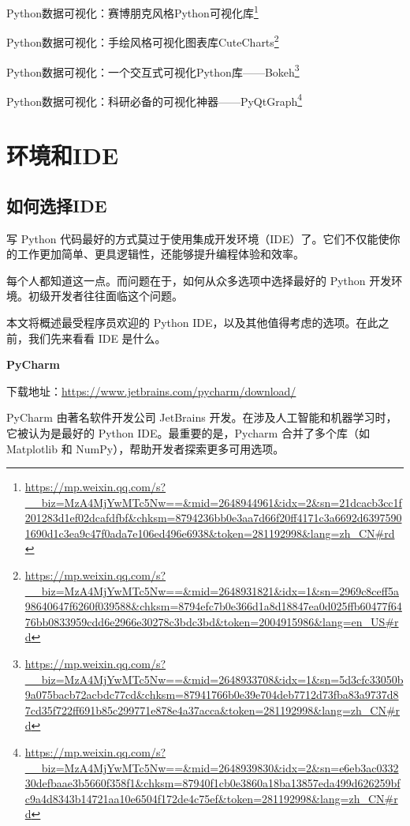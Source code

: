\documentclass[]{ctexbook}
\renewcommand{\href}[2]{#2\footnote{\url{#1}}}
\begin{document}
\href{https://mp.weixin.qq.com/s?__biz=MzA4MjYwMTc5Nw==\&mid=2648944961\&idx=2\&sn=21dcacb3cc1f201283d1ef02dcafdfbf\&chksm=8794236bb0e3aa7d66f20ff4171c3a6692d63975901690d1c3ea9c47f0ada7e106ed496e6938\&token=281192998\&lang=zh_CN\#rd}{Python数据可视化：赛博朋克风格Python可视化库}

\href{https://mp.weixin.qq.com/s?__biz=MzA4MjYwMTc5Nw==\&mid=2648931821\&idx=1\&sn=2969c8ceff5a98640647f6260f039588\&chksm=8794efc7b0e366d1a8d18847ea0d025ffb60477f6476bb0833959cdd6e2966e30278c3bdc3bd\&token=2004915986\&lang=en_US\#rd}{Python数据可视化：手绘风格可视化图表库CuteCharts}

\href{https://mp.weixin.qq.com/s?__biz=MzA4MjYwMTc5Nw==\&mid=2648933708\&idx=1\&sn=5d3cfc33050b9a075bacb72acbdc77cd\&chksm=87941766b0e39e704deb7712d73fba83a9737d87cd35f722ff691b85c299771e878e4a37acca\&token=281192998\&lang=zh_CN\#rd}{Python数据可视化：一个交互式可视化Python库------Bokeh}

\href{https://mp.weixin.qq.com/s?__biz=MzA4MjYwMTc5Nw==\&mid=2648939830\&idx=2\&sn=e6eb3ac033230defbaae3b5660f358f1\&chksm=87940f1cb0e3860a18ba13857eda499d626259bfc9a4d8343b14721aa10e6504f172de4c75ef\&token=281192998\&lang=zh_CN\#rd}{Python数据可视化：科研必备的可视化神器------PyQtGraph}

\hypertarget{ux73afux5883ux548cide}{%
\section{环境和IDE}\label{ux73afux5883ux548cide}}

\hypertarget{ux5982ux4f55ux9009ux62e9ide}{%
\subsection{如何选择IDE}\label{ux5982ux4f55ux9009ux62e9ide}}

写 Python 代码最好的方式莫过于使用集成开发环境（IDE）了。它们不仅能使你的工作更加简单、更具逻辑性，还能够提升编程体验和效率。

每个人都知道这一点。而问题在于，如何从众多选项中选择最好的 Python 开发环境。初级开发者往往面临这个问题。

本文将概述最受程序员欢迎的 Python IDE，以及其他值得考虑的选项。在此之前，我们先来看看 IDE 是什么。

\textbf{PyCharm}

下载地址：\url{https://www.jetbrains.com/pycharm/download/}

PyCharm 由著名软件开发公司 JetBrains 开发。在涉及人工智能和机器学习时，它被认为是最好的 Python IDE。最重要的是，Pycharm 合并了多个库（如 Matplotlib 和 NumPy），帮助开发者探索更多可用选项。
\end{document}
